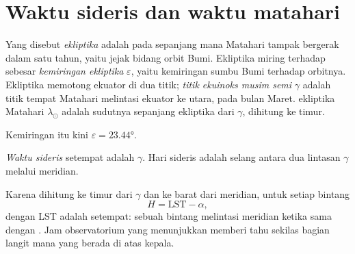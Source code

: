 \section{Waktu sideris dan waktu matahari}

\begin{definition}[Ekliptika]\label{def:b1:spherical-astronomy:ecliptic}
Yang disebut \emph{ekliptika} adalah  pada  sepanjang mana Matahari tampak bergerak dalam satu tahun, yaitu jejak bidang orbit Bumi. Ekliptika miring terhadap  sebesar \emph{kemiringan ekliptika} $\varepsilon$, yaitu kemiringan sumbu Bumi terhadap orbitnya. Ekliptika memotong ekuator di dua titik; \emph{titik ekuinoks musim semi} $\gamma$ adalah titik tempat Matahari melintasi ekuator ke utara, pada bulan Maret.  ekliptika Matahari $\lambda_\odot$ adalah sudutnya sepanjang ekliptika dari $\gamma$, dihitung ke timur.
\end{definition}

Kemiringan itu kini $\varepsilon = \ang{23.44}$.

\begin{definition}\label{def:b1:spherical-astronomy:sidereal-time}
\emph{Waktu sideris} setempat adalah   $\gamma$. Hari sideris adalah selang antara dua lintasan $\gamma$ melalui meridian.
\end{definition}

Karena  dihitung ke timur dari $\gamma$ dan  ke barat dari meridian, untuk setiap bintang
\[
  H = \mathrm{LST} - \alpha ,
\]
dengan LST adalah  setempat: sebuah bintang melintasi meridian ketika  sama dengan . Jam observatorium yang menunjukkan  memberi tahu sekilas bagian langit mana yang berada di atas kepala.

